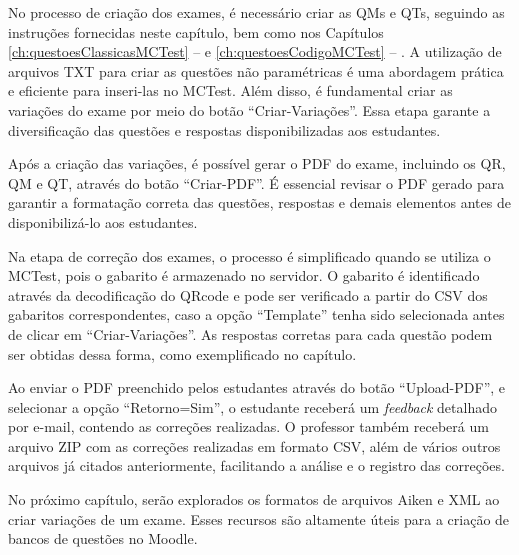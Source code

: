 No processo de criação dos exames, é necessário criar as QMs e QTs, seguindo as instruções fornecidas neste capítulo, bem como nos Capítulos \ref{ch:questoesClassicasMCTest} --  e \ref{ch:questoesCodigoMCTest} -- . A utilização de arquivos TXT para criar as questões não paramétricas é uma abordagem prática e eficiente para inseri-las no MCTest. Além disso, é fundamental criar as variações do exame por meio do botão ``Criar-Variações''. Essa etapa garante a diversificação das questões e respostas disponibilizadas aos estudantes.

Após a criação das variações, é possível gerar o PDF do exame, incluindo os QR, QM e QT, através do botão ``Criar-PDF''. É essencial revisar o PDF gerado para garantir a formatação correta das questões, respostas e demais elementos antes de disponibilizá-lo aos estudantes.

Na etapa de correção dos exames, o processo é simplificado quando se utiliza o MCTest, pois o gabarito é armazenado no servidor. O gabarito é identificado através da decodificação do QRcode e pode ser verificado a partir do CSV dos gabaritos correspondentes, caso a opção ``Template'' tenha sido selecionada antes de clicar em ``Criar-Variações''. As respostas corretas para cada questão podem ser obtidas dessa forma, como exemplificado no capítulo.

Ao enviar o PDF preenchido pelos estudantes através do botão ``Upload-PDF'', e selecionar a opção ``Retorno=Sim'', o estudante receberá um \textit{feedback} detalhado por e-mail, contendo as correções realizadas. O professor também receberá um arquivo ZIP com as correções realizadas em formato CSV, além de vários outros arquivos já citados anteriormente, facilitando a análise e o registro das correções.

No próximo capítulo, serão explorados os formatos de arquivos Aiken e XML ao criar variações de um exame. Esses recursos são altamente úteis para a criação de bancos de questões no Moodle.
